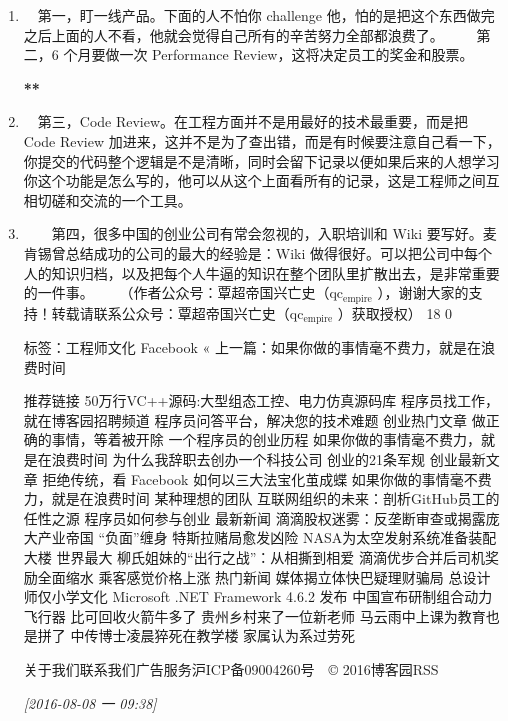 \documentclass[11pt]{ctexart}
\begin{document}
\begin{enumerate}
\item 　第一，盯一线产品。下面的人不怕你 challenge 他，怕的是把这个东西做完之后上面的人不看，他就会觉得自己所有的辛苦努力全部都浪费了。
\label{sec:orgheadline28}
　　第二，6 个月要做一次 Performance Review，这将决定员工的奖金和股票。

\textbf{**}
 　

\item 　第三，Code Review。在工程方面并不是用最好的技术最重要，而是把 Code Review 加进来，这并不是为了查出错，而是有时候要注意自己看一下，你提交的代码整个逻辑是不是清晰，同时会留下记录以便如果后来的人想学习你这个功能是怎么写的，他可以从这个上面看所有的记录，这是工程师之间互相切磋和交流的一个工具。
\label{sec:orgheadline29}

\item 　　第四，很多中国的创业公司有常会忽视的，入职培训和 Wiki 要写好。麦肯锡曾总结成功的公司的最大的经验是：Wiki 做得很好。可以把公司中每个人的知识归档，以及把每个人牛逼的知识在整个团队里扩散出去，是非常重要的一件事。
\label{sec:orgheadline30}
　　（作者公众号：覃超帝国兴亡史（qc\(_{\text{empire}}\) ），谢谢大家的支持！转载请联系公众号：覃超帝国兴亡史（qc\(_{\text{empire}}\) ）获取授权）
18 0

标签：工程师文化 Facebook
« 上一篇：如果你做的事情毫不费力，就是在浪费时间



推荐链接
50万行VC++源码:大型组态工控、电力仿真源码库
程序员找工作，就在博客园招聘频道
程序员问答平台，解决您的技术难题
创业热门文章
做正确的事情，等着被开除
一个程序员的创业历程
如果你做的事情毫不费力，就是在浪费时间
为什么我辞职去创办一个科技公司
创业的21条军规
创业最新文章
拒绝传统，看 Facebook 如何以三大法宝化茧成蝶
如果你做的事情毫不费力，就是在浪费时间
某种理想的团队
互联网组织的未来：剖析GitHub员工的任性之源
程序员如何参与创业
最新新闻
滴滴股权迷雾：反垄断审查或揭露庞大产业帝国
“负面”缠身 特斯拉赌局愈发凶险
NASA为太空发射系统准备装配大楼 世界最大
柳氏姐妹的“出行之战”：从相撕到相爱
滴滴优步合并后司机奖励全面缩水 乘客感觉价格上涨
热门新闻
媒体揭立体快巴疑理财骗局 总设计师仅小学文化
Microsoft .NET Framework 4.6.2 发布
中国宣布研制组合动力飞行器 比可回收火箭牛多了
贵州乡村来了一位新老师 马云雨中上课为教育也是拼了
中传博士凌晨猝死在教学楼 家属认为系过劳死

关于我们联系我们广告服务沪ICP备09004260号　© 2016博客园RSS


\textit{[2016-08-08 一 09:38]}
\end{enumerate}
\end{document}
